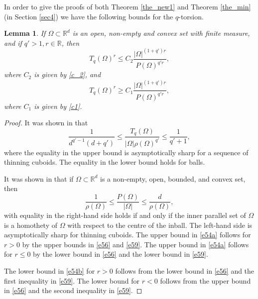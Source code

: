 \documentclass[a4paper,9pt]{article}
\newcommand{\R}{\mathbb{R}}
\newtheorem{lemma}[theorem]{Lemma}
\newcommand{\Om}{\Omega}
\begin{document}
In order to give the proofs of both Theorem  \ref{the_new1} and Theorem  \ref{the_min} (in Section \ref{sec4}) we have the following bounds for the $q$-torsion.
\begin{lemma}\label{lem0}
If $\Omega\subset\R^d$ is an open, non-empty and convex set with finite measure, and if $q'>1,r\in\R$, then
\begin{equation}\label{e54a}
T_q(\Om)^r\le C_2\frac{|\Om|^{(1+q')r}}{P(\Om)^{q'r}},
\end{equation}
where $C_2$ is given by \eqref{c_2},
and
\begin{equation}\label{e54b}
T_q(\Om)^r\ge C_1\frac{|\Om|^{(1+q')r}}{P(\Om)^{q'r}},
\end{equation}
where $C_1$ is given by \eqref{c1}.
\end{lemma}
\begin{proof}
It was shown in \cite{JDE} that
\begin{equation}\label{e56}
 \displaystyle \frac{1}{d^{q'-1}(d+q')}\le\frac{T_q(\Omega)}{|\Omega|\rho(\Omega)^{q'}}\le \frac{1}{q'+1},
\end{equation}
where the equality in the upper bound is asymptotically sharp for  a sequence of thinning cuboids. The equality in the lower bound holds for balls.

It was shown in \cite{Anona} that if
 $\Omega\subset \R^d$ is  a non-empty, open, bounded, and convex set, then
\begin{equation}
\label{e59}
\frac{1}{\rho(\Omega)} \le \displaystyle \frac{P(\Omega)}{|\Omega|} \le \displaystyle \frac{d}{\rho(\Omega)},
\end{equation}
with equality in the right-hand side holds if and only if the inner parallel set of $\Om$ is a homothety of $\Om$ with respect to the centre of the inball. The left-hand side is asymptotically sharp for thinning cuboids.
The upper bound in \eqref{e54a} follows for $r>0$ by the upper bounds in \eqref{e56} and \eqref{e59}. The upper bound in \eqref{e54a} follows for $r\le0$ by the lower bound in \eqref{e56} and the lower bound in \eqref{e59}.

The lower bound in \eqref{e54b} for $r>0$ follows from the lower bound in \eqref{e56} and the first inequality in \eqref{e59}. The lower bound for $r<0$ follows from  the upper bound in \eqref{e56} and the second inequality in \eqref{e59}.
\end{proof}

\smallskip
\end{document}
